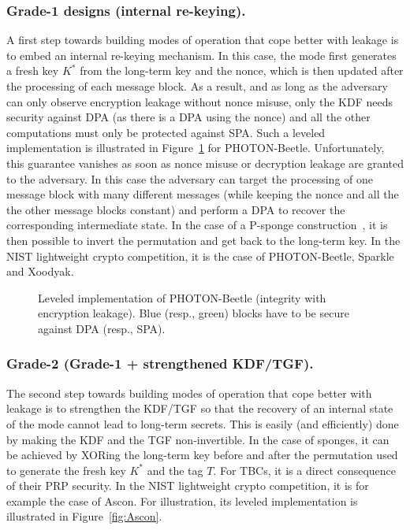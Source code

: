 \documentclass{llncs}
\begin{document}
\subsubsection{Grade-1 designs (internal re-keying).} A first step towards
building modes of operation that cope better with leakage is to embed an internal
re-keying mechanism. In this case, the mode first generates a fresh
key $K^*$ from the long-term key and the nonce, which is then updated 
after the processing of each message block. As a result, and 
as long as the adversary can only observe encryption leakage 
without nonce misuse, only the KDF needs security against DPA (as there is
a DPA using the nonce) and all the other computations must only be protected 
against SPA. Such a leveled implementation is illustrated in Figure~\ref{fig:photon}
for PHOTON-Beetle. Unfortunately, this guarantee vanishes
as soon as nonce misuse or decryption leakage are granted to the adversary.
In this case the adversary can target the processing of one message block
with many different messages (while keeping the nonce and all the the other message blocks constant)
and perform a DPA to recover the corresponding intermediate state. In the
case of a P-sponge construction~\cite{Sponge07}, it is then possible to invert the permutation
and get back to the long-term key. 
In the NIST lightweight
crypto competition, it is the case of 
PHOTON-Beetle, Sparkle and Xoodyak.

\begin{figure}
    \centering
    
	\caption{Leveled implementation of PHOTON-Beetle (integrity with encryption leakage).
	Blue (resp., green) blocks have to be secure against DPA (resp., SPA).}
        \label{fig:photon}\vspace*{-0.5cm}
\end{figure}

\subsubsection{Grade-2 (Grade-1 + strengthened KDF/TGF).}
The second step towards
building modes of operation that cope better with leakage is to strengthen the
KDF/TGF so that the recovery of an internal state of the mode cannot
lead to long-term secrets. This is easily (and efficiently) done
by making the KDF and the TGF non-invertible. In the case of 
sponges, it can be achieved by XORing the long-term key before and
after the permutation used to generate the fresh key $K^*$ and the
tag $T$. For TBCs, it is a direct consequence of their PRP 
security. In the NIST lightweight
crypto competition, it is for example the case of 
Ascon. For illustration, its leveled implementation 
is illustrated in
Figure~\ref{fig:Ascon}.
\end{document}
